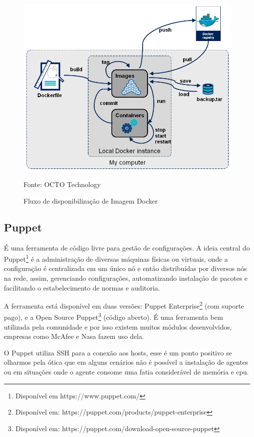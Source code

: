 \begin{figure}[htb]
	\centering
	\includegraphics[width=0.7\linewidth]{imagens/docker-stages}
	\caption{Fluxo de disponibilização de Imagem Docker}
	Fonte: OCTO Technology\footnotemark	
	\label{fig:docker-stages}
	
\end{figure}

\subsection{Puppet}
É uma ferramenta de código livre para gestão de configurações. A ideia central do Puppet\footnote{Disponível em https://www.puppet.com/} é a administração de diversas máquinas físicas ou virtuais, onde a configuração é centralizada em um único nó e então distribuídas por diversos nós na rede, assim, gerenciando configurações, automatizando instalação de pacotes e facilitando o estabelecimento de normas e auditoria.\cite{walberg2008automate}

A ferramenta está disponível em duas versões: Puppet Enterprise\footnote{Disponível em: https://puppet.com/products/puppet-enterprise} (com suporte pago), e a Open Source Puppet\footnote{Disponível em: https://puppet.com/download-open-source-puppet} (código aberto). É uma ferramenta bem utilizada pela comunidade e por isso existem muitos módulos desenvolvidos, empresas como McAfee e Nasa fazem uso dela.

O Puppet utiliza SSH para a conexão aos hosts, esse é um ponto positivo se olharmos pela ótica que em alguns cenários não é possível a instalação de agentes ou em situações onde o agente consome uma fatia considerável de memória e cpu.

